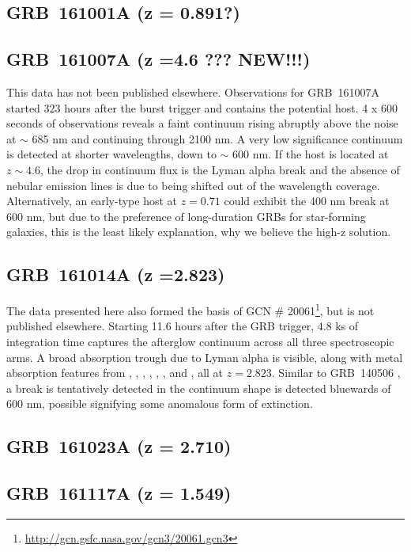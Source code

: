 \documentclass{aa}    %
\begin{document}
\subsection{GRB~161001A (z = 0.891?)}	



\subsection{GRB~161007A (z =4.6 ??? NEW!!!)}
This data has not been published elsewhere. Observations for GRB~161007A started
323 hours after the burst trigger and contains the potential host. 4 x 600 seconds
of observations reveals a faint continuum rising abruptly above the noise at
$\sim$ 685 nm and continuing through 2100 nm. A very low significance
continuum is detected at shorter wavelengths, down to $\sim$ 600 nm. If the
host is located at $z \sim 4.6$, the drop in continuum flux is the Lyman alpha
break and the absence of nebular emission lines is due to \oii being shifted
out of the wavelength coverage. Alternatively, an early-type host at $z = 0.71$
could exhibit the 400 nm break at 600 nm, but due to the preference of
long-duration GRBs for star-forming galaxies, this is the least likely
explanation, why we believe the high-z solution.

\subsection{GRB~161014A (z =2.823)} The data presented here also formed the
basis of GCN \# 20061\footnote{\url{http://gcn.gsfc.nasa.gov/gcn3/20061.gcn3}},
but is not published elsewhere. Starting 11.6 hours after the GRB trigger, 4.8
ks of integration time captures the afterglow continuum across all three
spectroscopic arms. A broad absorption trough due to Lyman alpha is visible,
along with metal absorption features from \mgii, \SIii, \cii, \civ, \alii,
\aliii, and	\feii, all at $z =2.823$. Similar to GRB~140506 \citep{Fynbo2014,
	Heintz2017b},  a break is tentatively detected in the continuum shape is
detected bluewards of 600 nm, possible signifying some anomalous form of
extinction.


\subsection{GRB~161023A (z = 2.710)}	 \label{GRB161023A}


\subsection{GRB~161117A (z = 1.549)}	
\end{document}
